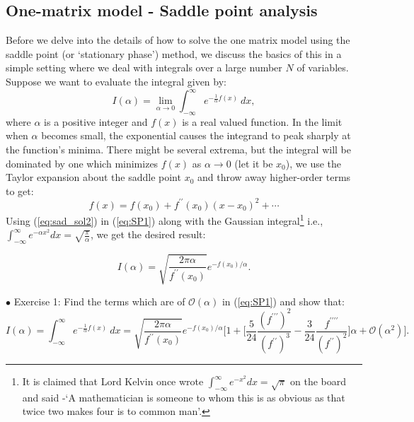 \documentclass[letter,11pt]{article}
\begin{document}
\subsection{One-matrix model - Saddle point analysis}
Before we delve into the details of how to solve the one matrix model using the saddle point (or `stationary phase') method, we discuss the basics of this in a simple setting where we deal with integrals over a large number $N$ of variables. Suppose we want to evaluate the integral given by:
\begin{equation}
\label{eq:SP1} 
I(\alpha) = \lim_{\alpha \to 0} \int_{-\infty}^{\infty} e^{-\frac{1}{\alpha}f(x)} ~dx, 
\end{equation}
where $\alpha$ is a positive integer and $f(x)$ is a real valued function. In the limit when $\alpha$ becomes small, the exponential causes the integrand to peak sharply at the function's minima. There might be several extrema, but the integral will be dominated by one which minimizes $f(x)$ as $\alpha \to 0$ (let it be $x_{0}$), 
we use the Taylor expansion about the saddle point $x_{0}$ and throw away higher-order terms to get:
\begin{equation}
	\label{eq:sad_sol2}
	f(x) = f(x_{0}) + f^{\prime\prime}(x_{0}) (x-x_0)^{2} + \cdots 
\end{equation}
Using (\ref{eq:sad_sol2}) in (\ref{eq:SP1}) along with the Gaussian integral\footnote{It is claimed that Lord Kelvin once wrote $\int_{-\infty}^{\infty}e^{-x^2} dx = \sqrt{\pi}$ on the board 
	and said -`A mathematician is someone to whom this is as obvious as that 
	twice two makes four is to common man'.} 
i.e., $\int_{-\infty}^{\infty} e^{-\alpha x^2} dx = \sqrt{\frac{\pi}{\alpha}}$, we get the desired result:

\begin{equation}
	\label{eq:sad_sol1} 
	I(\alpha) =  \sqrt{\frac{2\pi \alpha}{f^{\prime\prime}(x_{0})}} e^{-f(x_{0})/\alpha}. 
\end{equation}



\begin{mdframed}[backgroundcolor=blue!3] 
	$\bullet$ Exercise 1: Find the terms which are of $\mathcal{O}(\alpha)$ in (\ref{eq:SP1}) and show that:
	\begin{equation*}
	I(\alpha) = \int_{-\infty}^{\infty} e^{-\frac{1}{\alpha}f(x)} ~dx = \sqrt{\frac{2\pi \alpha}{f^{\prime\prime}(x_{0})}} e^{-f(x_{0})/\alpha} \Bigg[1 + 
	\Big[ \frac{5}{24} \frac{(f^{\prime\prime\prime})^2}{(f^{\prime\prime})^3} - \frac{3}{24} \frac{f^{\prime\prime\prime\prime}}{(f^{\prime\prime})^2}\Big] \alpha + \mathcal{O}(\alpha^{2})\Bigg]. 
	\end{equation*}	
\end{mdframed} 
\end{document}

